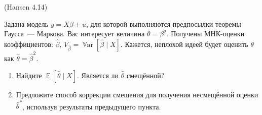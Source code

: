 \documentclass[12pt]{article}
\DeclareMathOperator{\Var}{\mathbb{V}ar}
\DeclareMathOperator{\E}{\mathbb{E}}
\newcommand{\hb}{\hat{\beta}}
\begin{document}
\begin{problem}(Hansen 4.14)

Задана модель $y = X \beta + u$, для которой выполняются предпосылки теоремы Гаусса~— Маркова. 
Вас интересует величина $\theta = \beta^2$. 
Получены МНК-оценки коэффициентов: $\hb$, $V_{\hb} = \Var [\hb \mid X]$. 
Кажется, неплохой идеей будет оценить $\theta$ как $\hat{\theta} = \hb^2$.

\begin{enumerate}
    \item Найдите $\E [\hat{\theta} \mid X]$. Является ли $\hat{\theta}$ смещённой?
    \item Предложите способ коррекции смещения для получения несмещённой оценки  $\hat{\theta}^*$, используя результаты предыдущего пункта.
\end{enumerate}

\begin{sol}
\end{sol}

\end{problem}
\end{document}
